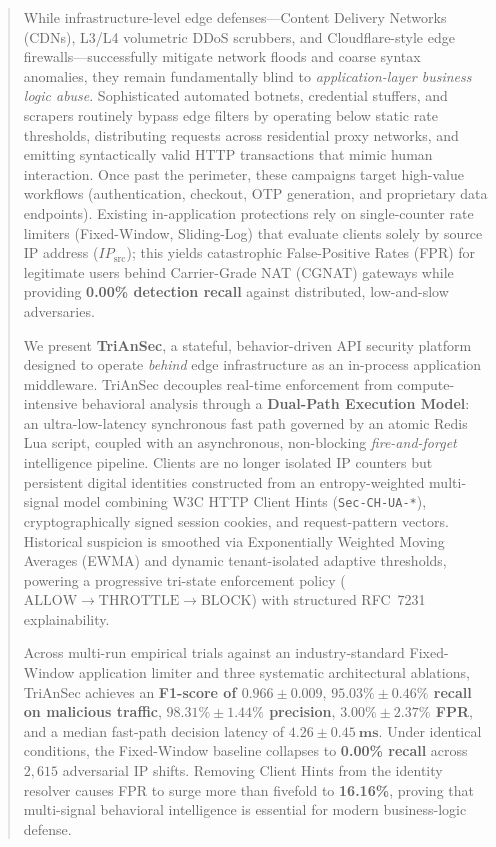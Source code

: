 \documentclass[journal,10pt]{IEEEtran}
\newcommand{\ip}{IP_{\mathrm{src}}}
\begin{document}
\begin{abstract}
While infrastructure-level edge defenses---Content Delivery Networks (CDNs), L3/L4 volumetric DDoS scrubbers, and Cloudflare-style edge firewalls---successfully mitigate network floods and coarse syntax anomalies, they remain fundamentally blind to \emph{application-layer business logic abuse}. Sophisticated automated botnets, credential stuffers, and scrapers routinely bypass edge filters by operating below static rate thresholds, distributing requests across residential proxy networks, and emitting syntactically valid HTTP transactions that mimic human interaction. Once past the perimeter, these campaigns target high-value workflows (authentication, checkout, OTP generation, and proprietary data endpoints). Existing in-application protections rely on single-counter rate limiters (Fixed-Window, Sliding-Log) that evaluate clients solely by source IP address ($\ip$); this yields catastrophic False-Positive Rates (FPR) for legitimate users behind Carrier-Grade NAT (CGNAT) gateways while providing \textbf{0.00\% detection recall} against distributed, low-and-slow adversaries.

We present \textbf{TriAnSec}, a stateful, behavior-driven API security platform designed to operate \emph{behind} edge infrastructure as an in-process application middleware. TriAnSec decouples real-time enforcement from compute-intensive behavioral analysis through a \textbf{Dual-Path Execution Model}: an ultra-low-latency synchronous fast path governed by an atomic Redis Lua script, coupled with an asynchronous, non-blocking \emph{fire-and-forget} intelligence pipeline. Clients are no longer isolated IP counters but persistent digital identities constructed from an entropy-weighted multi-signal model combining W3C HTTP Client Hints (\texttt{Sec-CH-UA-*}), cryptographically signed session cookies, and request-pattern vectors. Historical suspicion is smoothed via Exponentially Weighted Moving Averages (EWMA) and dynamic tenant-isolated adaptive thresholds, powering a progressive tri-state enforcement policy ($\mathrm{ALLOW}\!\to\!\mathrm{THROTTLE}\!\to\!\mathrm{BLOCK}$) with structured RFC~7231 explainability.

Across multi-run empirical trials against an industry-standard Fixed-Window application limiter and three systematic architectural ablations, TriAnSec achieves an \textbf{F1-score of $0.966\pm0.009$}, \textbf{$95.03\%\pm0.46\%$ recall on malicious traffic}, \textbf{$98.31\%\pm1.44\%$ precision}, \textbf{$3.00\%\pm2.37\%$ FPR}, and a median fast-path decision latency of $\mathbf{4.26\pm0.45\ \text{ms}}$. Under identical conditions, the Fixed-Window baseline collapses to \textbf{0.00\% recall} across $2{,}615$ adversarial IP shifts. Removing Client Hints from the identity resolver causes FPR to surge more than fivefold to \textbf{16.16\%}, proving that multi-signal behavioral intelligence is essential for modern business-logic defense.
\end{abstract}
\end{document}
